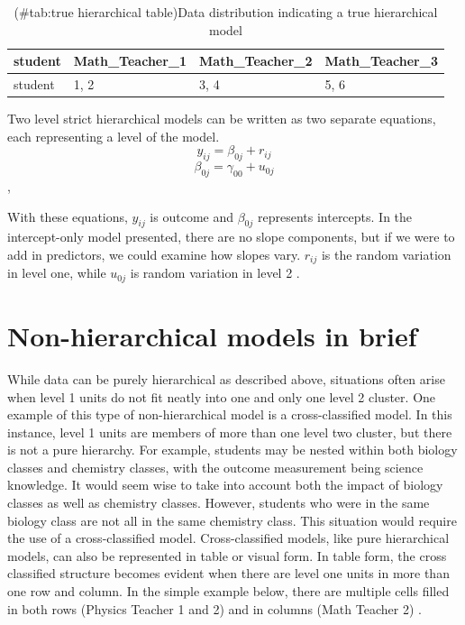 \documentclass[
]{book}
\begin{document}
\begin{table}

\caption{(\#tab:true hierarchical table)Data distribution indicating a true hierarchical model}
\centering
\begin{tabular}[t]{llll}
\toprule
student & Math\_Teacher\_1 & Math\_Teacher\_2 & Math\_Teacher\_3\\
\midrule
student & 1, 2 & 3, 4 & 5, 6\\
\bottomrule
\end{tabular}
\end{table}

Two level strict hierarchical models can be written as two separate equations, each representing a level of the model.\\
\[y_{ij} = \beta_{0j} + r_{ij}\]
\[\beta_{0j} = \gamma_{00} + u_{0j}\],

With these equations, \(y_{ij}\) is outcome and \(\beta_{0j}\) represents intercepts. In the intercept-only model presented, there are no slope components, but if we were to add in predictors, we could examine how slopes vary. \(r_{ij}\) is the random variation in level one, while \(u_{0j}\) is random variation in level 2 \citep{SnijdersICC}.

\hypertarget{non-hierarchical-models-in-brief}{%
\section{Non-hierarchical models in brief}\label{non-hierarchical-models-in-brief}}

While data can be purely hierarchical as described above, situations often arise when level 1 units do not fit neatly into one and only one level 2 cluster. One example of this type of non-hierarchical model is a cross-classified model. In this instance, level 1 units are members of more than one level two cluster, but there is not a pure hierarchy. For example, students may be nested within both biology classes and chemistry classes, with the outcome measurement being science knowledge. It would seem wise to take into account both the impact of biology classes as well as chemistry classes. However, students who were in the same biology class are not all in the same chemistry class. This situation would require the use of a cross-classified model. Cross-classified models, like pure hierarchical models, can also be represented in table or visual form. In table form, the cross classified structure becomes evident when there are level one units in more than one row and column. In the simple example below, there are multiple cells filled in both rows (Physics Teacher 1 and 2) and in columns (Math Teacher 2) \citep{Beretvas}.
\end{document}
